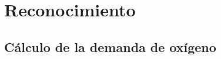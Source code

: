 \section{Reconocimiento}\label{sec:ReconocimientoSVM}



%


\subsection{Cálculo de la demanda de oxígeno} \label{secc:calculoDemandaOxigeno}

%
%
%
%  
	
\newpage


